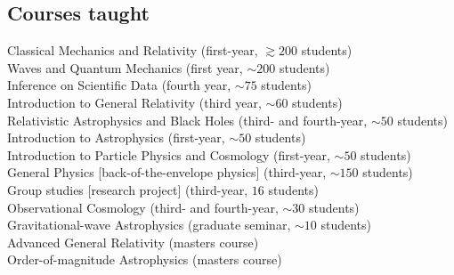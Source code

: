 \documentclass[margin,line]{res}
\begin{document}
\begin{resume}
\section{\sc Courses taught}
Classical Mechanics and Relativity (first-year, $\gtrsim 200$ students)\\
Waves and Quantum Mechanics (first year, $\sim 200$ students)\\
Inference on Scientific Data (fourth year, $\sim 75$ students)\\
Introduction to General Relativity (third year, $\sim 60$ students)\\
Relativistic Astrophysics and Black Holes (third- and fourth-year, $\sim 50$ students)\\
Introduction to Astrophysics (first-year, $\sim 50$ students)\\ 
Introduction to Particle Physics and Cosmology (first-year, $\sim 50$ students)\\ 
General Physics [back-of-the-envelope physics] (third-year, $\sim 150$ students)\\
Group studies [research project] (third-year, $16$ students)\\
Observational Cosmology (third- and fourth-year, $\sim 30$ students)\\
Gravitational-wave Astrophysics (graduate seminar, $\sim 10$ students)\\
Advanced General Relativity (masters course)\\
Order-of-magnitude Astrophysics (masters course)\\




\end{resume}
\end{document}
